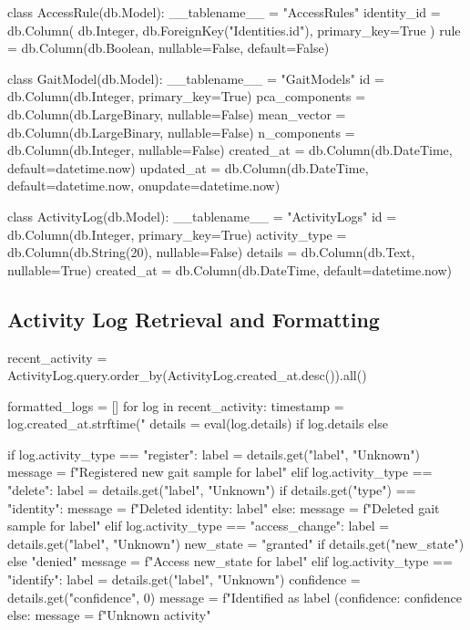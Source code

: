 \begin{appendices}
\begin{code}
class AccessRule(db.Model):
    __tablename__ = "AccessRules"
    identity_id = db.Column(
        db.Integer, db.ForeignKey("Identities.id"), primary_key=True
    )
    rule = db.Column(db.Boolean, nullable=False, default=False)


class GaitModel(db.Model):
    __tablename__ = "GaitModels"
    id = db.Column(db.Integer, primary_key=True)
    pca_components = db.Column(db.LargeBinary, nullable=False)
    mean_vector = db.Column(db.LargeBinary, nullable=False)
    n_components = db.Column(db.Integer, nullable=False)
    created_at = db.Column(db.DateTime, default=datetime.now)
    updated_at = db.Column(db.DateTime, default=datetime.now, onupdate=datetime.now)


class ActivityLog(db.Model):
    __tablename__ = "ActivityLogs"
    id = db.Column(db.Integer, primary_key=True)
    activity_type = db.Column(db.String(20), nullable=False)
    details = db.Column(db.Text, nullable=True)
    created_at = db.Column(db.DateTime, default=datetime.now)
    \end{code}

    \subsection{Activity Log Retrieval and Formatting}
    \label{app:activity-log-retrieval-and-formatting}

    \begin{code}
recent_activity = ActivityLog.query.order_by(ActivityLog.created_at.desc()).all()

formatted_logs = []
for log in recent_activity:
    timestamp = log.created_at.strftime("%
    details = eval(log.details) if log.details else {}

    if log.activity_type == "register":
        label = details.get("label", "Unknown")
        message = f"Registered new gait sample for {label}"
    elif log.activity_type == "delete":
        label = details.get("label", "Unknown")
        if details.get("type") == "identity":
            message = f"Deleted identity: {label}"
        else:
            message = f"Deleted gait sample for {label}"
    elif log.activity_type == "access_change":
        label = details.get("label", "Unknown")
        new_state = "granted" if details.get("new_state") else "denied"
        message = f"Access {new_state} for {label}"
    elif log.activity_type == "identify":
        label = details.get("label", "Unknown")
        confidence = details.get("confidence", 0)
        message = f"Identified as {label} (confidence: {confidence}%
    else:
        message = f"Unknown activity"


\end{code}
\end{appendices}
